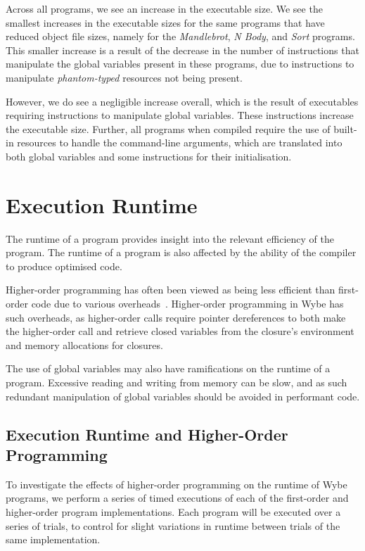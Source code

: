 Across all programs, we see an increase in the executable size. We see the smallest increases in the executable sizes for the same programs that have reduced object file sizes, namely for the \textit{Mandlebrot}, \textit{N Body}, and \textit{Sort} programs. This smaller increase is a result of the decrease in the number of instructions that manipulate the global variables present in these programs, due to instructions to manipulate \textit{phantom-typed} resources not being present. 

However, we do see a negligible increase overall, which is the result of executables requiring instructions to manipulate global variables. These instructions increase the executable size. Further, all programs when compiled require the use of built-in resources to handle the command-line arguments, which are translated into both global variables and some instructions for their initialisation.

\section{Execution Runtime}
\label{sec:runtime}

The runtime of a program provides insight into the relevant efficiency of the program. The runtime of a program is also affected by the ability of the compiler to produce optimised code. 

Higher-order programming has often been viewed as being less efficient than first-order code due to various overheads~\cite{dragos2008optimising, appel1996empirical, leissa2015graph}. Higher-order programming in Wybe has such overheads, as higher-order calls require pointer dereferences to both make the higher-order call and retrieve closed variables from the closure's environment and memory allocations for closures.

The use of global variables may also have ramifications on the runtime of a program. Excessive reading and writing from memory can be slow, and as such redundant manipulation of global variables should be avoided in performant code.

\subsection{Execution Runtime and Higher-Order Programming}

To investigate the effects of higher-order programming on the runtime of Wybe programs, we perform a series of timed executions of each of the first-order and higher-order program implementations. Each program will be executed over a series of trials, to control for slight variations in runtime between trials of the same implementation.

